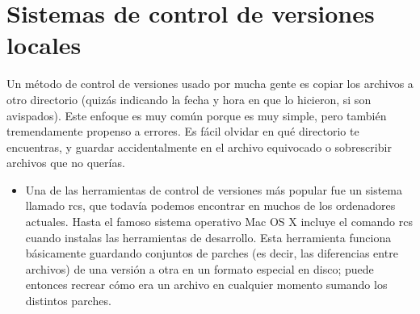 
\section{Sistemas de control de versiones locales} 
Un método de control de versiones usado por mucha gente es copiar los archivos a otro directorio (quizás indicando la fecha y hora en que lo hicieron, si son avispados). Este enfoque es muy común porque es muy simple, pero también tremendamente propenso a errores. Es fácil olvidar en qué directorio te encuentras, y guardar accidentalmente en el archivo equivocado o sobrescribir archivos que no querías.

\begin{itemize}
	\begin{center}
	\texttt{[image: ./Imagenes/imagen3]} 
	\end{center}

	\item Una de las herramientas de control de versiones más popular fue un sistema llamado rcs, que todavía podemos encontrar en muchos de los ordenadores actuales. Hasta el famoso sistema operativo Mac OS X incluye el comando rcs cuando instalas las herramientas de desarrollo. Esta herramienta funciona básicamente guardando conjuntos de parches (es decir, las diferencias entre archivos) de una versión a otra en un formato especial en disco; puede entonces recrear cómo era un archivo en cualquier momento sumando los distintos parches.



\end{itemize} 